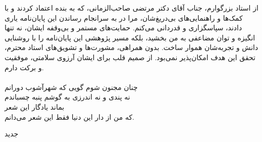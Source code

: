 


\begin{center}
\end{center}

از استاد بزرگوارم، جناب آقای دکتر مرتضی صاحب‌الزمانی، که به بنده اعتماد کردند و با کمک‌ها و راهنمایی‌های بی‌دریغ‌شان، مرا در به سرانجام رساندن این پایان‌نامه یاری دادند، سپاسگزاری و قدردانی می‌کنم. حمایت‌های مستمر و بی‌وقفه ایشان، نه تنها انگیزه و توان مضاعفی به من بخشید، بلکه مسیر پژوهشی این پایان‌نامه را با روشنایی دانش و تجربه‌شان هموار ساخت. بدون همراهی، مشورت‌ها و تشویق‌های استاد محترم، تحقق این هدف امکان‌پذیر نمی‌بود. از صمیم قلب برای ایشان آرزوی سلامتی، موفقیت و برکت دارم. \\ \\



چنان مجنون شوم گویی که شهرآشوب دورانم\\
نه پندی و نه اندرزی به گوشم پنبه چسباندم\\
بماند یادگار این شعر\\
که من از دار این دنیا فقط این شعر می‌دانم.

‌جدید
